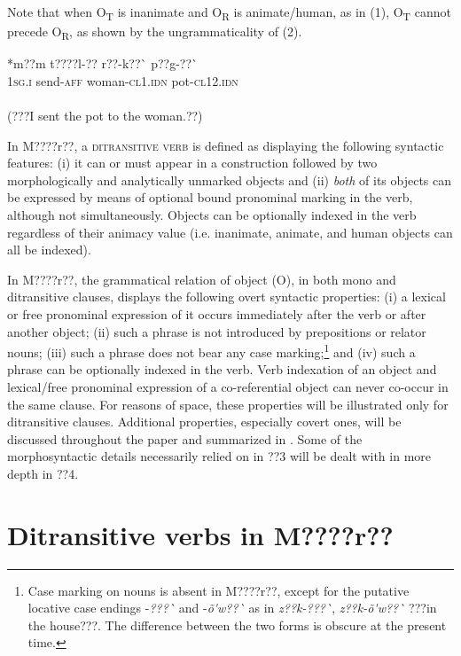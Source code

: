 \documentclass[output=paper]{langsci/langscibook}
\begin{document}
Note that when O\textsubscript{T} is inanimate and O\textsubscript{R} is animate/human, as in (1), O\textsubscript{T} cannot precede O\textsubscript{R}, as shown by the ungrammaticality of (2).


\ea \gll 
\label{bkm:Ref444692191}*m??m  t????l-??    r??-k??\`{ }      p??g-??\`{ }
\\
%
\textsc{1sg.i}    send-\textsc{aff}  woman-\textsc{cl1.idn}  pot-\textsc{cl12.idn}
\\\\\glt
(???I sent the pot to the woman.??)
\z

In M????r??, a \textsc{ditransitive verb} is defined as displaying the following syntactic features: (i) it can or must appear in a construction followed by two morphologically and analytically unmarked objects and (ii) \textit{both} of its objects can be expressed by means of optional bound pronominal marking in the verb, although not simultaneously. Objects can be optionally indexed in the verb regardless of their animacy value (i.e. inanimate, animate, and human objects can all be indexed).

In M????r??, the grammatical relation of object (O), in both mono and ditransitive clauses, displays the following overt syntactic properties: (i) a lexical or free pronominal expression of it occurs immediately after the verb or after another object; (ii) such a phrase is not introduced by prepositions or relator nouns; (iii) such a phrase does not bear any case marking;\footnote{ Case marking on nouns is absent in M????r??, except for the putative locative case endings -\textit{???\`{ } }and -\textit{\~{o}\'{ }w??\`{ }} as in \textit{z??k-???\`{ }}, \textit{z??k-\~{o}\'{ }w??\`{ }} ???in the house???. The difference between the two forms is obscure at the present time.  }{ }and (iv) such a phrase can be optionally indexed in the verb. Verb indexation of an object and lexical/free pronominal expression of a co-referential object can never co-occur in the same clause. For reasons of space, these properties will be illustrated only for ditransitive clauses. Additional properties, especially covert ones, will be discussed throughout the paper and summarized in . Some of the morphosyntactic details necessarily relied on in ??3 will be dealt with in more depth in ??4.

\section{Ditransitive verbs in M????r??}
\end{document}
